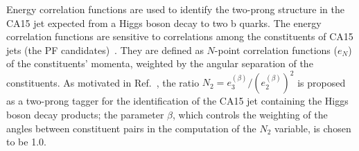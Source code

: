 
Energy correlation functions are used to identify the two-prong
structure in the CA15 jet expected from a Higgs boson decay to two b
quarks. The energy correlation functions are sensitive to correlations among the constituents
of CA15 jets (the PF candidates)~\cite{ecf}. They are defined as $N$-point correlation functions ($e_N$) of the constituents' momenta, weighted by the angular separation of the constituents.
%                                                                                                                                                                                                
As motivated in Ref.~\cite{ecf}, the ratio $N_2 =
e_3^{(\beta)}/(e_2^{(\beta)})^2$ is proposed as a two-prong tagger for
the identification of the CA15 jet containing the Higgs boson decay
products; the parameter $\beta$, which controls the weighting of the angles between constituent pairs in the computation of
the $N_2$ variable, is chosen to be 1.0. 



